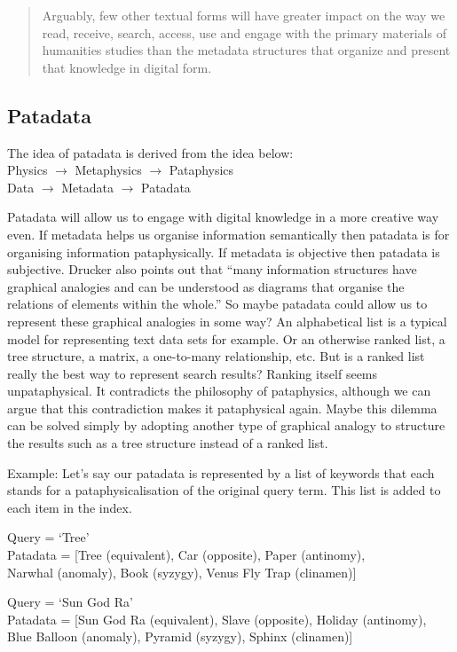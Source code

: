 \begin{quote}
  Arguably, few other textual forms will have greater impact on the way we read, receive, search, access, use and engage with the primary materials of humanities studies than the metadata structures that organize and present that knowledge in digital form. \autocite[p.9]{Drucker2009}
\end{quote}


\subsection{Patadata}

The idea of patadata is derived from the idea below:\\
Physics $\to$ Metaphysics $\to$ Pataphysics\\
Data $\to$ Metadata $\to$ Patadata

Patadata will allow us to engage with digital knowledge in a more creative way even. If metadata helps us organise information semantically then patadata is for organising information pataphysically. If metadata is objective then patadata is subjective. Drucker also points out that ``many information structures have graphical analogies and can be understood as diagrams that organise the relations of elements within the whole.'' \autocite[p.16]{Drucker2009} So maybe patadata could allow us to represent these graphical analogies in some way? An alphabetical list is a typical model for representing text data sets for example. Or an otherwise ranked list, a tree structure, a matrix, a one-to-many relationship, etc. But is a ranked list really the best way to represent search results? Ranking itself seems unpataphysical. It contradicts the philosophy of pataphysics, although we can argue that this contradiction makes it pataphysical again. Maybe this dilemma can be solved simply by adopting another type of graphical analogy to structure the results such as a tree structure instead of a ranked list.

Example: Let's say our patadata is represented by a list of keywords that each stands for a pataphysicalisation of the original query term. This list is added to each item in the index.

Query      = `Tree'\\
Patadata = [Tree (equivalent),  Car (opposite), Paper (antinomy),\\ Narwhal (anomaly), Book (syzygy), Venus Fly Trap (clinamen)]

Query      = `Sun God Ra'\\
Patadata = [Sun God Ra (equivalent), Slave (opposite), Holiday (antinomy),\\ Blue Balloon (anomaly), Pyramid (syzygy), Sphinx (clinamen)]


